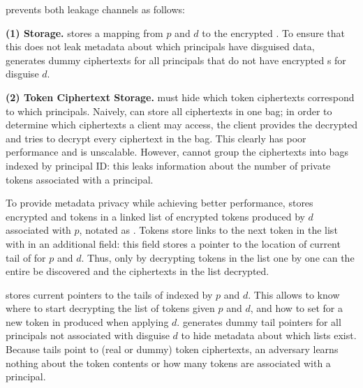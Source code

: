 \noindent
\sys prevents both leakage channels as follows:

\vspace{6pt}\noindent\textbf{(1) \symk{} Storage.}
\sys stores a mapping from $p$ and $d$ to the encrypted . To ensure that this does not leak
metadata about which principals have disguised data, \sys generates dummy ciphertexts for all
principals that do not have encrypted s for disguise $d$.

\vspace{6pt}\noindent\textbf{(2) Token Ciphertext Storage.}
\sys must hide which token ciphertexts correspond to which principals.  Naively, \sys can store
all ciphertexts in one bag; in order to determine which ciphertexts a client may access, the client
provides the decrypted  and \sys tries to decrypt every ciphertext in the bag. This clearly
has poor performance and is unscalable.
However, \sys cannot group the ciphertexts into bags indexed by principal ID: this leaks information
about the number of private tokens associated with a principal.

To provide metadata privacy while achieving better performance, \sys stores encrypted  and
 tokens in a linked list of encrypted tokens produced by $d$ associated with $p$, notated
as . 
Tokens store links to the next token in the list with in an additional  field: this
field stores a pointer to the location of current tail of  for $p$ and $d$.
Thus, only by decrypting tokens in the list one by one can the entire  be discovered and
the ciphertexts in the list decrypted.

\sys stores current pointers to the tails of  indexed by $p$ and $d$. This allows \sys to
know where to start decrypting the list of tokens given $p$ and $d$, and how to set
 for a new token in  produced when applying $d$. \sys generates dummy
tail pointers for all principals not associated with disguise $d$ to hide metadata about which lists
exist.
Because  tails point to (real or dummy) token ciphertexts, an adversary learns nothing
about the token contents or how many tokens are associated with a principal.
